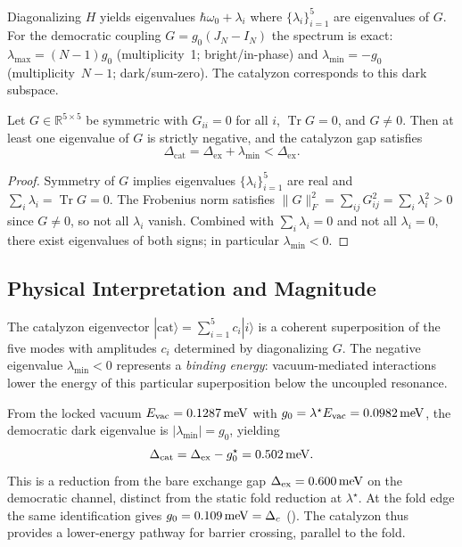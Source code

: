 \documentclass[11pt,letterpaper]{article}
\begin{document}
Diagonalizing $H$ yields eigenvalues $\hbar \omega_0 + \lambda_i$ where $\{\lambda_i\}_{i=1}^5$ are eigenvalues of $G$. For the democratic coupling $G=g_0(J_N-I_N)$ the spectrum is exact: $\lambda_{\max}=(N-1)g_0$ (multiplicity~1; bright/in-phase) and $\lambda_{\min}=-g_0$ (multiplicity~$N-1$; dark/sum-zero). The catalyzon corresponds to this dark subspace. 

\begin{theorem}
Let $G \in \mathbb{R}^{5\times 5}$ be symmetric with $G_{ii} = 0$ for all $i$, $\operatorname{Tr} G = 0$, and $G \neq 0$. Then at least one eigenvalue of $G$ is strictly negative, and the catalyzon gap satisfies
\begin{equation}
\boxed{\Delta_{\text{cat}} = \Delta_{\text{ex}} + \lambda_{\min} < \Delta_{\text{ex}}.}
\end{equation}
\end{theorem}

\begin{proof}
Symmetry of $G$ implies eigenvalues $\{\lambda_i\}_{i=1}^5$ are real and $\sum_i \lambda_i = \operatorname{Tr} G = 0$. The Frobenius norm satisfies $\|G\|_F^2 = \sum_{ij} G_{ij}^2 = \sum_i \lambda_i^2 > 0$ since $G \neq 0$, so not all $\lambda_i$ vanish. Combined with $\sum_i \lambda_i = 0$ and not all $\lambda_i = 0$, there exist eigenvalues of both signs; in particular $\lambda_{\min} < 0$.
\end{proof}

\subsection{Physical Interpretation and Magnitude}

The catalyzon eigenvector $|\text{cat}\rangle = \sum_{i=1}^5 c_i |i\rangle$ is a coherent superposition of the five modes with amplitudes $c_i$ determined by diagonalizing $G$. The negative eigenvalue $\lambda_{\min} < 0$ represents a \textit{binding energy}: vacuum-mediated interactions lower the energy of this particular superposition below the uncoupled resonance.

From the locked vacuum $E_{\mathrm{vac}}=0.1287\,\mathrm{meV}$ with $g_0=\lambda^\star E_{\mathrm{vac}}=0.0982\,\mathrm{meV}$, the democratic dark eigenvalue is $|\lambda_{\min}|=g_0$, yielding
\begin{equation}
\Delta_{\text{cat}} = \Delta_{\text{ex}}-g_0^\star = 0.502\,\mathrm{meV}.
\end{equation}
This is a \pctcat{} reduction from the bare exchange gap $\Delta_{\text{ex}} = 0.600\,\mathrm{meV}$ on the democratic channel, distinct from the static fold reduction at $\lambda^\star$. At the fold edge the same identification gives $g_0=0.109\,\mathrm{meV}=\Delta_c$ (\pctcatfold). The catalyzon thus provides a lower-energy pathway for barrier crossing, parallel to the fold.
\end{document}
